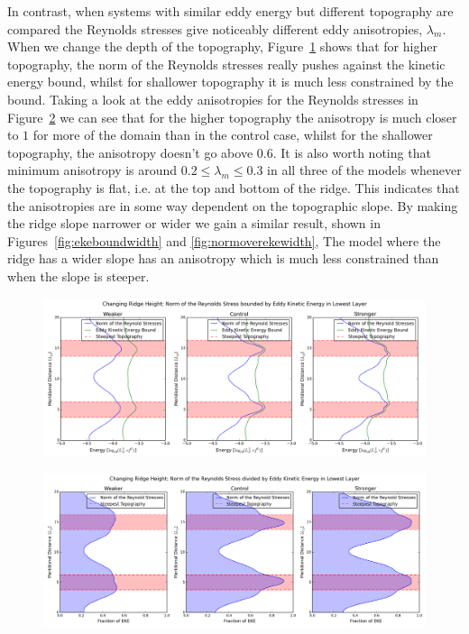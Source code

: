\documentclass[12pt,a4paper]{report}
\newcommand*\figref[1]{Figure~\ref{#1}}
\begin{document}
In contrast, when systems with similar eddy energy but different topography are compared
the Reynolds stresses give noticeably  different eddy anisotropies,
$\lambda_{m}$. When we change the depth of the topography, \figref{fig:ekeboundheight}
shows that for higher topography, the norm of the Reynolds stresses really pushes against
the kinetic energy bound, whilst for shallower topography it is much less constrained by the
bound. Taking a look at the  eddy anisotropies for the Reynolds stresses in 
\figref{fig:normoverekeheight} we can see that for the higher topography the anisotropy
is much closer to $1$ for more of the domain than in the control case, whilst for the
 shallower topography, the  anisotropy doesn't go above $0.6$. It is also worth
 noting that minimum anisotropy is around $0.2 \leq \lambda_{m} \leq 0.3$ in
 all three of the models whenever the topography is flat, i.e. at the top and bottom of 
 the ridge. This indicates that the anisotropies are in some way dependent on 
 the topographic slope. By making the ridge slope narrower or wider we gain a similar
 result, shown in Figures~\ref{fig:ekeboundwidth} and \ref{fig:normoverekewidth},
 The model where the ridge has a wider slope has an anisotropy which is much less
 constrained than when the slope is steeper.  


\begin{figure}
	\centering
	\includegraphics[width=\linewidth]{ekebound_1_1}
	\caption{ }
	\label{fig:ekeboundheight}
\end{figure}

\begin{figure}
	\centering
	\includegraphics[width=\linewidth]{normovereke_1_1}
	\caption{ }
	\label{fig:normoverekeheight}
\end{figure}
\end{document}
